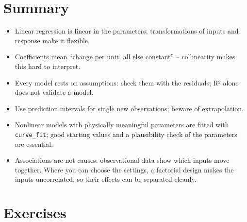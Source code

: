 \documentclass[
  letterpaper,
  DIV=11,
  numbers=noendperiod]{scrreprt}
\providecommand{\tightlist}{%
  \setlength{\itemsep}{0pt}\setlength{\parskip}{0pt}}\usepackage{longtable,booktabs,array}
\begin{document}
\section{Summary}\label{summary-5}

\begin{tcolorbox}[enhanced jigsaw, left=2mm, title=\textcolor{quarto-callout-important-color}{\faExclamation}\hspace{0.5em}{Key takeaways}, opacityback=0, breakable, rightrule=.15mm, arc=.35mm, toptitle=1mm, colbacktitle=quarto-callout-important-color!10!white, opacitybacktitle=0.6, coltitle=black, colframe=quarto-callout-important-color-frame, bottomrule=.15mm, leftrule=.75mm, bottomtitle=1mm, titlerule=0mm, toprule=.15mm, colback=white]

\begin{itemize}
\tightlist
\item
  Linear regression is linear in the parameters; transformations of
  inputs and response make it flexible.
\item
  Coefficients mean ``change per unit, all else constant'' --
  collinearity makes this hard to interpret.
\item
  Every model rests on assumptions: check them with the residuals; R²
  alone does not validate a model.
\item
  Use prediction intervals for single new observations; beware of
  extrapolation.
\item
  Nonlinear models with physically meaningful parameters are fitted with
  \texttt{curve\_fit}; good starting values and a plausibility check of
  the parameters are essential.
\item
  Associations are not causes: observational data show which inputs move
  together. Where you can choose the settings, a factorial design makes
  the inputs uncorrelated, so their effects can be separated cleanly.
\end{itemize}

\end{tcolorbox}

\section{Exercises}\label{exercises-5}
\end{document}
